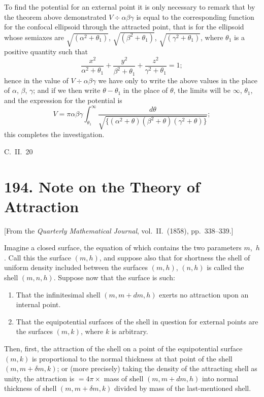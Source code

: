 \documentclass[12pt,a4paper]{article}
\theoremstyle{definition}
\begin{document}
To find the potential for an external point it is only necessary to remark that
by the theorem above demonstrated $V \div \alpha\beta\gamma$ is equal to the corresponding function
for the confocal ellipsoid through the attracted point, that is for the ellipsoid whose
semiaxes are $\sqrt{(\alpha^2+\theta_1)}$, $\sqrt{(\beta^2+\theta_1)}$, $\sqrt{(\gamma^2+\theta_1)}$, where $\theta_1$ is a positive
quantity such that
\[
\frac{x^2}{\alpha^2+\theta_1} + \frac{y^2}{\beta^2+\theta_1} + \frac{z^2}{\gamma^2+\theta_1} = 1;
\]
hence in the value of $V \div \alpha\beta\gamma$ we have only to write the above values in the place
of $\alpha$, $\beta$, $\gamma$; and if we then write $\theta - \theta_1$ in the place of $\theta$, the limits will be
$\infty$, $\theta_1$, and the expression for the potential is
\[
V = \pi\alpha\beta\gamma \int_{\theta_1}^\infty \frac{d\theta}{\sqrt{\{(
\alpha^2+\theta)(\beta^2+\theta)(\gamma^2+\theta)\}}};
\]
this completes the investigation.

\hfill C.~II.~20

\newpage


\section*{194. Note on the Theory of Attraction}

\begin{center}
[From the \textit{Quarterly Mathematical Journal}, vol.~II.~(1858), pp.~338--339.]
\end{center}

\bigskip

\noindent
Imagine a closed surface, the equation of which contains the two parameters $m$,~$h$.
Call this the surface $(m, h)$, and suppose also that for shortness the shell of uniform
density included between the surfaces $(m, h)$, $(n, h)$ is called the shell $(m, n, h)$.
Suppose now that the surface is such:

\begin{enumerate}
\item That the infinitesimal shell $(m, m + dm, h)$ exerts no attraction upon an
internal point.
\item That the equipotential surfaces of the shell in question for external points
are the surfaces $(m, k)$, where $k$ is arbitrary.
\end{enumerate}

Then, first, the attraction of the shell on a point of the equipotential surface
$(m, k)$ is proportional to the normal thickness at that point of the shell $(m, m+\delta m, k)$;
or (more precisely) taking the density of the attracting shell as unity, the attraction is
$= 4\pi \times$ mass of shell $(m, m + dm, h)$ into normal thickness of shell $(m, m + \delta m, k)$
divided by mass of the last-mentioned shell.
\end{document}

